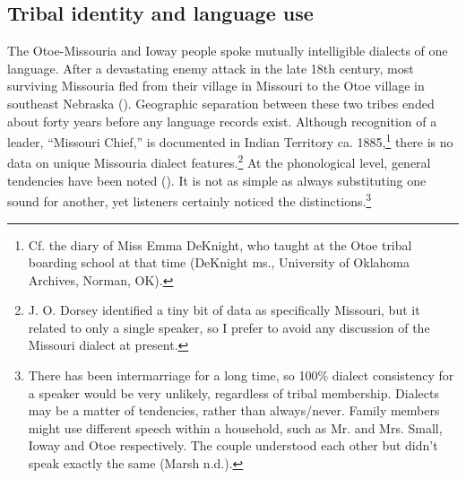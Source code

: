 \documentclass[output=paper]{LSP/langsci}
\begin{document}
\subsection{Tribal identity and language use} 	The Otoe-Missouria and Ioway people spoke mutually intelligible dialects of one language.  After a devastating enemy attack in the late 18th century, most surviving Missouria fled from their village in Missouri to the Otoe village in southeast Nebraska (\citealt{Schweitzer2001}).  Geographic separation between these two tribes ended about forty years before any language records exist.  Although recognition of a leader, ``Missouri Chief,'' is documented in Indian Territory ca. 1885,\footnote{Cf. the diary of Miss Emma DeKnight, who taught at the Otoe tribal boarding school at that time (DeKnight ms., University of Oklahoma Archives, Norman, OK).}  there is no data on unique Missouria dialect features.\footnote{J. O. Dorsey identified a tiny bit of data as specifically Missouri, but it related to only a single speaker, so I prefer to avoid any discussion of the Missouri dialect at present.}  At the phonological level, general tendencies have been noted (). It is not as simple as always substituting one sound for another, yet listeners certainly noticed the distinctions.\footnote{There has been intermarriage for a long time, so 100\% dialect consistency for a speaker would be very unlikely, regardless of tribal membership. Dialects may be a matter of tendencies, rather than always/never. Family members might use different speech within a household, such as Mr. and Mrs. Small, Ioway and Otoe respectively. The couple understood each other but didn't speak exactly the same (Marsh n.d.).}	
\end{document}
